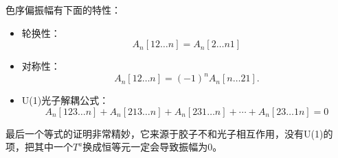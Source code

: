 色序偏振幅有下面的特性：
\begin{itemize}
	\item 轮换性：
	\begin{equation}
		A_n[12\ldots n]=A_n[2\ldots n1]
	\end{equation}
	\item 对称性：
	\begin{equation}
		A_n[12\ldots n]=(-1)^nA_n[n\ldots21].
	\end{equation}
	\item U(1)光子解耦公式：
	\begin{equation}
		A_n[123\ldots n]+A_n[213\ldots n]+A_n[231\ldots n]+\cdots+A_n[23\ldots1n]=0
	\end{equation}
\end{itemize}
最后一个等式的证明非常精妙，它来源于胶子不和光子相互作用，没有U(1)的项，把其中一个$T^a$换成恒等元一定会导致振幅为0。
